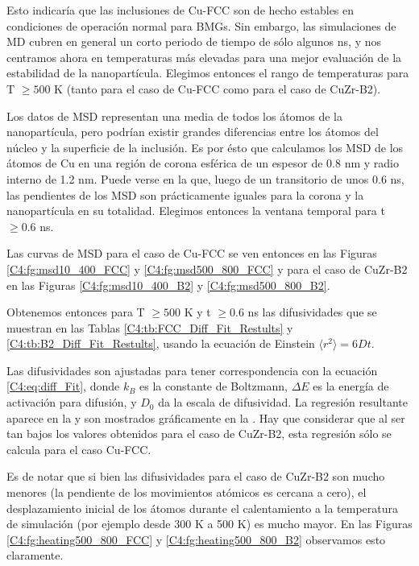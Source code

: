 Esto indicaría que las inclusiones de Cu-FCC son de hecho estables en condiciones de operación normal para BMGs. Sin embargo, las simulaciones de MD cubren en general un corto periodo de tiempo de sólo algunos ns, y nos centramos ahora en temperaturas más elevadas para una mejor evaluación de la estabilidad de la nanopartícula. Elegimos entonces el rango de temperaturas para T $ \geq 500$ K (tanto para el caso de Cu-FCC como para el caso de CuZr-B2).

Los datos de MSD representan una media de todos los átomos de la nanopartícula, pero podrían existir grandes diferencias entre los átomos del núcleo y la superficie de la inclusión. Es por ésto que calculamos los MSD de los átomos de Cu en una región de corona esférica de un espesor de 0.8 nm y radio interno de 1.2 nm. Puede verse en la  que, luego de un transitorio de unos 0.6 ns, las pendientes de los MSD son prácticamente iguales para la corona y la nanopartícula en su totalidad. Elegimos entonces la ventana temporal para t $ \geq 0.6 $ ns.

Las curvas de MSD para el caso de Cu-FCC se ven entonces en las Figuras \ref{C4:fg:msd10_400_FCC} y \ref{C4:fg:msd500_800_FCC} y para el caso de CuZr-B2 en las Figuras \ref{C4:fg:msd10_400_B2} y \ref{C4:fg:msd500_800_B2}.

Obtenemos entonces para T $ \geq 500$ K y t $ \geq 0.6 $ ns las difusividades que se muestran en las Tablas \ref{C4:tb:FCC_Diff_Fit_Restults} y \ref{C4:tb:B2_Diff_Fit_Restults}, usando la ecuación de Einstein $\langle r^{2}\rangle = 6Dt$.

Las difusividades son ajustadas para tener correspondencia con la ecuación \ref{C4:eq:diff_Fit}, donde $k_{B}$ es la constante de Boltzmann, $\Delta E$ es la energía de activación para difusión, y $D_{0}$ da la escala de difusividad. La regresión resultante aparece en la  y son mostrados gráficamente en la . Hay que considerar que al ser tan bajos los valores obtenidos para el caso de CuZr-B2, esta regresión sólo se calcula para el caso Cu-FCC.

Es de notar que si bien las difusividades para el caso de CuZr-B2 son mucho menores (la pendiente de los movimientos atómicos es cercana a cero), el desplazamiento inicial de los átomos durante el calentamiento a la temperatura de simulación (por ejemplo desde 300 K a 500 K) es mucho mayor. En las Figuras \ref{C4:fg:heating500_800_FCC} y \ref{C4:fg:heating500_800_B2} observamos esto claramente.

